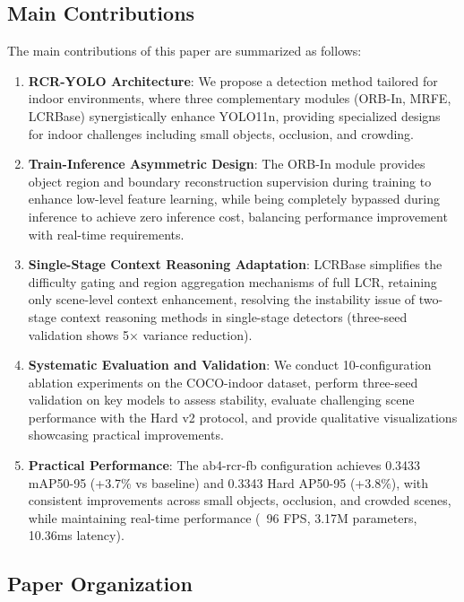 \documentclass[journal]{IEEEtran}
\begin{document}
\subsection{Main Contributions}

The main contributions of this paper are summarized as follows:

\begin{enumerate}
    \item \textbf{RCR-YOLO Architecture}: We propose a detection method tailored for indoor environments, where three complementary modules (ORB-In, MRFE, LCRBase) synergistically enhance YOLO11n, providing specialized designs for indoor challenges including small objects, occlusion, and crowding.

    \item \textbf{Train-Inference Asymmetric Design}: The ORB-In module provides object region and boundary reconstruction supervision during training to enhance low-level feature learning, while being completely bypassed during inference to achieve zero inference cost, balancing performance improvement with real-time requirements.

    \item \textbf{Single-Stage Context Reasoning Adaptation}: LCRBase simplifies the difficulty gating and region aggregation mechanisms of full LCR, retaining only scene-level context enhancement, resolving the instability issue of two-stage context reasoning methods in single-stage detectors (three-seed validation shows 5× variance reduction).

    \item \textbf{Systematic Evaluation and Validation}: We conduct 10-configuration ablation experiments on the COCO-indoor dataset, perform three-seed validation on key models to assess stability, evaluate challenging scene performance with the Hard v2 protocol, and provide qualitative visualizations showcasing practical improvements.

    \item \textbf{Practical Performance}: The ab4-rcr-fb configuration achieves 0.3433 mAP50-95 (+3.7\% vs baseline) and 0.3343 Hard AP50-95 (+3.8\%), with consistent improvements across small objects, occlusion, and crowded scenes, while maintaining real-time performance (~96 FPS, 3.17M parameters, 10.36ms latency).
\end{enumerate}

\subsection{Paper Organization}
\end{document}
